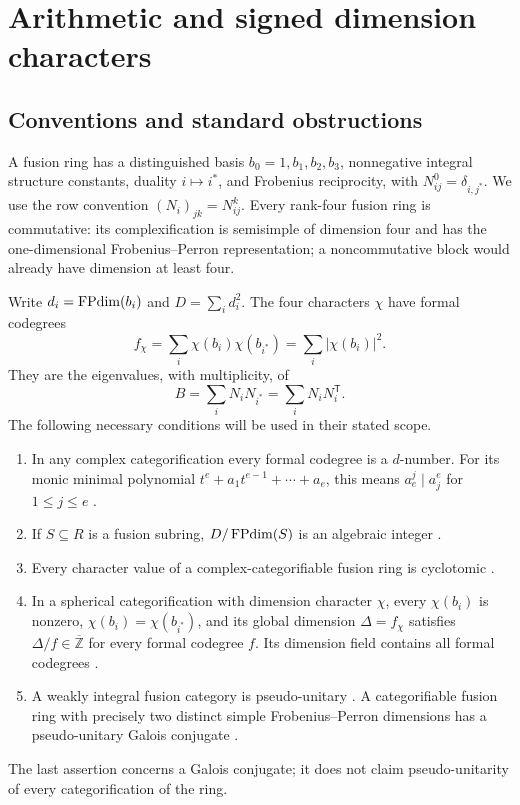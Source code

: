 \section{Arithmetic and signed dimension characters}\label{sec:finite-arithmetic}
\subsection{Conventions and standard obstructions}
A fusion ring has a distinguished basis $b_0=1,b_1,b_2,b_3$, nonnegative
integral structure constants, duality $i\mapsto i^*$, and Frobenius
reciprocity, with $N_{ij}^0=\delta_{i,j^*}$. We use the row convention
$(N_i)_{jk}=N_{ij}^k$. Every rank-four fusion ring is commutative: its
complexification is semisimple of dimension four and has the one-dimensional
Frobenius--Perron representation; a noncommutative block would already have
dimension at least four.

Write $d_i=\operatorname{FPdim}(b_i)$ and $D=\sum_i d_i^2$. The four characters $\chi$
have formal codegrees
\[
f_\chi=\sum_i\chi(b_i)\chi(b_{i^*})
       =\sum_i|\chi(b_i)|^2.
\]
They are the eigenvalues, with multiplicity, of
\begin{equation}\label{eq:casimir}
 B=\sum_i N_iN_{i^*}=\sum_iN_iN_i^{\mathsf T}.
\end{equation}
The following necessary conditions will be used in their stated scope.
\begin{proposition}\label{prop:standard}
\begin{enumerate}
\item In any complex categorification every formal codegree is a
$d$-number. For its monic minimal polynomial
$t^e+a_1t^{e-1}+\cdots+a_e$, this means
$a_e^j\mid a_j^e$ for $1\leq j\leq e$
\cite{OstrikCodegrees}.
\item If $S\subseteq R$ is a fusion subring, $D/\operatorname{FPdim}(S)$ is an
algebraic integer \cite[Theorem 7.17.6]{EGNO}.
\item Every character value of a complex-categorifiable fusion ring is
cyclotomic \cite[Theorem 8.51 and Corollary 8.53]{ENO}.
\item In a spherical categorification with dimension character $\chi$,
every $\chi(b_i)$ is nonzero, $\chi(b_i)=\chi(b_{i^*})$, and its global
dimension $\Delta=f_\chi$ satisfies $\Delta/f\in\overline{\mathbb Z}$
for every formal codegree $f$. Its dimension field contains all formal
codegrees \cite[Theorem 2.13 and Corollaries 2.14--2.15]{OstrikRank3}.
\item A weakly integral fusion category is pseudo-unitary
\cite[Proposition 8.24]{ENO}. A categorifiable fusion ring with precisely
two distinct simple Frobenius--Perron dimensions has a pseudo-unitary
Galois conjugate \cite[Lemma 3.1]{Schopieray}.
\end{enumerate}
\end{proposition}
The last assertion concerns a Galois conjugate; it does not claim
pseudo-unitarity of every categorification of the ring.

